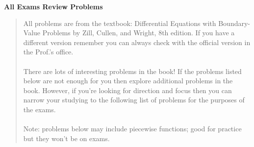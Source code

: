 \documentclass{article}
\begin{document}
\begin{center}{\bf All Exams Review Problems}
\end{center}

\begin{quote}
All problems are from the textbook:  Differential Equations with Boundary-Value Problems by Zill, Cullen, and Wright, 8th edition.  If you have a different version remember you can always check with the official version in the Prof.'s office.\\
\\
There are lots of interesting problems in the book!  If the problems listed below are not enough  for you then explore additional problems in the book.  However, if you're looking for direction and focus then you can narrow your studying to the following list of problems for the purposes of  the exams.\\
\\ 
Note: problems below may include piecewise functions; good for practice but they won't be on exams.\\
\end{quote}

\thispagestyle{empty}
\end{document}

